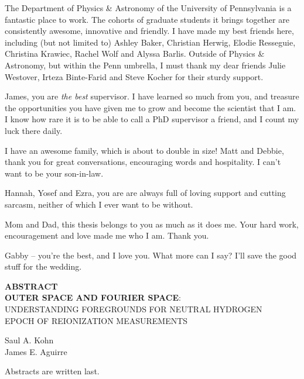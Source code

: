 \documentclass[12pt,twoside,openany]{book}
\newcommand{\singlespaced}{\renewcommand{\baselinestretch}{1}\normalfont}
\newcommand{\tita}{{\bf OUTER SPACE AND FOURIER SPACE}:\\UNDERSTANDING FOREGROUNDS FOR NEUTRAL HYDROGEN\\EPOCH OF REIONIZATION MEASUREMENTS}
\begin{document}
The Department of Physics \& Astronomy of the University of Pennsylvania is a fantastic place to work. The cohorts of graduate students it brings together are consistently awesome, innovative and friendly. I have made my best friends here, including (but not limited to) Ashley Baker, Christian Herwig, Elodie Resseguie, Christina Krawiec, Rachel Wolf and Alyssa Barlis. Outside of Physics \& Astronomy, but within the Penn umbrella, I must thank my dear friends Julie Westover, Irteza Binte-Farid and Steve Kocher for their sturdy support.

James, you are \textit{the best} supervisor. I have learned so much from you, and treasure the opportunities you have given me to grow and become the scientist that I am. I know how rare it is to be able to call a PhD supervisor a friend, and I count my luck there daily.

I have an awesome family, which is about to double in size! Matt and Debbie, thank you for great conversations, encouraging words and hospitality. I can't want to be your son-in-law.

Hannah, Yosef and Ezra, you are are always full of loving support and cutting sarcasm, neither of which I ever want to be without.

Mom and Dad, this thesis belongs to you as much as it does me. Your hard work, encouragement and love made me who I am. Thank you.

Gabby -- you're the best, and I love you. What more can I say? I'll save the good stuff for the wedding.



\newpage
\vspace*{.15 in}
\begin{center}
{\bf ABSTRACT}\\
\tita \\
\parskip=0.2in


Saul A. Kohn\\
James E. Aguirre
\end{center}
\noindent
Abstracts are written last.

\vspace*{\fill}

\newpage

\singlespaced
\tableofcontents

\end{document}
